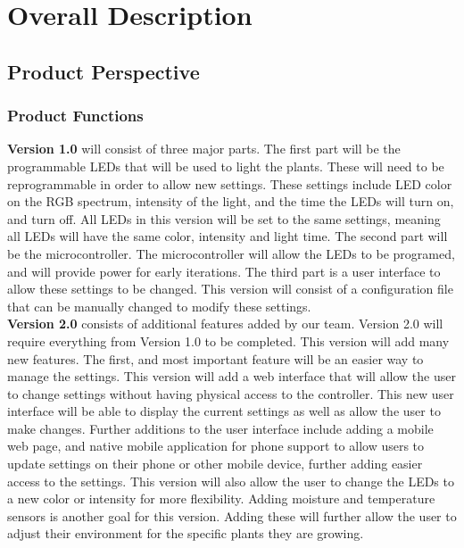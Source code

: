 	\section{Overall Description}
		\subsection{Product Perspective}

		\subsubsection{Product Functions}
		\noindent \textbf{Version 1.0} will consist of three major parts. The first part will be the programmable LEDs that will be used to light the plants. These will need to be reprogrammable in order to allow new settings.
		These settings include LED color on the RGB spectrum, intensity of the light, and the time the LEDs will turn on, and turn off. All LEDs in this version will be set to the same settings, meaning all
		LEDs will have the same color, intensity and light time. The second part will be the microcontroller. The microcontroller will allow the LEDs to be programed, and will provide power for early iterations.
		The third part is a user interface to allow these settings to be changed. This version will consist of a configuration file that can be manually changed to modify these settings.\\

		\noindent \textbf{Version 2.0} consists of additional features added by our team. Version 2.0 will require everything from Version 1.0 to be completed. This version will add many new features. The first, and most
		important feature will be an easier way to manage the settings. This version will add a web interface that will allow the user to change settings without having physical access to the controller.
		This new user interface will be able to display the current settings as well as allow the user to make changes. Further additions to the user interface include adding a mobile web page, and native mobile application for
		phone support to allow users to update settings on their phone or other mobile device, further adding easier access to the settings. This version will also allow the user to change the LEDs to a new color or intensity for more flexibility. Adding moisture and temperature sensors is another goal for this version. Adding these will further allow the user to adjust
		their environment for the specific plants they are growing.\\

